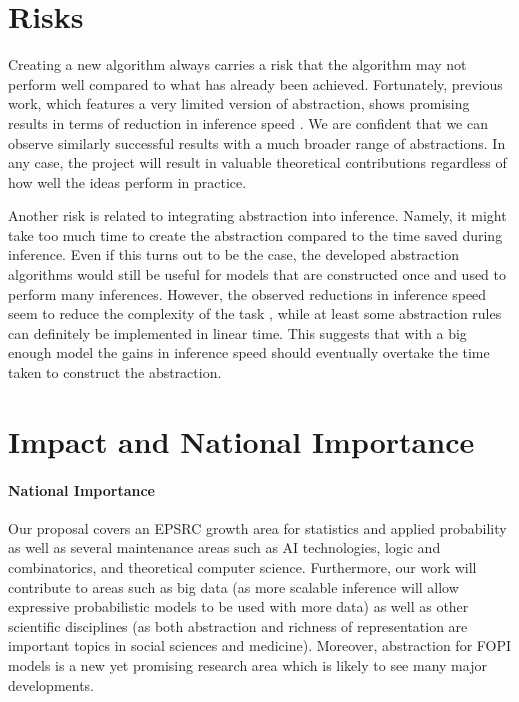 \documentclass{article}
\begin{document}
\section{Risks}

Creating a new algorithm always carries a risk that the algorithm may not
perform well compared to what has already been achieved. Fortunately, previous
work, which features a very limited version of abstraction, shows promising
results in terms of reduction in inference speed
\cite{DBLP:conf/icml/HoltzenBM18}. We are confident that we can observe
similarly successful results with a much broader range of abstractions. In any
case, the project will result in valuable theoretical contributions regardless
of how well the ideas perform in practice.

Another risk is related to integrating abstraction into inference. Namely, it
might take too much time to create the abstraction compared to the time saved
during inference. Even if this turns out to be the case, the developed
abstraction algorithms would still be useful for models that are constructed
once and used to perform many inferences. However, the observed reductions in
inference speed seem to reduce the complexity of the task
\cite{DBLP:conf/icml/HoltzenBM18}, while at least some abstraction rules can
definitely be implemented in linear time. This suggests that with a big enough
model the gains in inference speed should eventually overtake the time taken to
construct the abstraction.

\section{Impact and National Importance}

\paragraph{National Importance}

Our proposal covers an EPSRC growth area for statistics and applied probability
as well as several maintenance areas such as AI technologies, logic and
combinatorics, and theoretical computer science. Furthermore, our work will
contribute to areas such as big data (as more scalable inference will allow
expressive probabilistic models to be used with more data) as well as other
scientific disciplines (as both abstraction and richness of representation are
important topics in social sciences and medicine). Moreover, abstraction for
FOPI models is a new yet promising research area
\cite{DBLP:conf/icml/HoltzenBM18} which is likely to see many major
developments.
\end{document}
